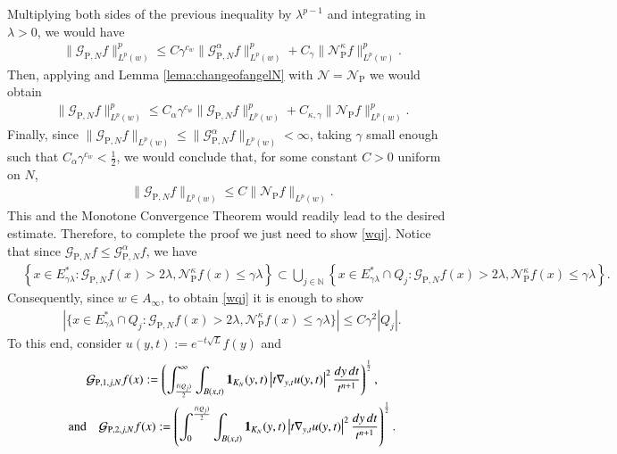 \documentclass[11pt, a4paper,leqno]{amsart}
\renewcommand{\chi}{{\bf 1}}
\theoremstyle{plain}
\theoremstyle{definition}
\theoremstyle{remark}
\numberwithin{equation}{section}
\def \N{ \mathbb{N} }
\def \pp{ \mathrm{P} }
\def \Gcal { \mathcal{G} }
\def \Ncal { \mathcal{N} }
\begin{document}
Multiplying both sides of the previous inequality by $\lambda^{p-1}$ and integrating in $\lambda>0$, we would have
\begin{align*}
\|\Gcal_{\pp,N}f\|_{L^p(w)}^p\leq C\gamma^{c_w}\|\Gcal_{\pp,N}^{\alpha}f\|_{L^p(w)}^p+ C_{\gamma}\|\Ncal_{\pp}^{\kappa}f\|_{L^p(w)}^p.
\end{align*}
Then, applying \cite[Proposition 3.2]{MartellPrisuelos} and Lemma \ref{lema:changeofangelN} with $\mathcal{N}=\mathcal{N}_{\pp}$ we would obtain
\begin{align*}
\|\Gcal_{\pp,N}f\|_{L^p(w)}^p\leq C_{\alpha}\gamma^{c_w}\|\Gcal_{\pp,N}f\|_{L^p(w)}^p+ C_{\kappa,\gamma}\|\Ncal_{\pp}f\|_{L^p(w)}^p.
\end{align*}
Finally, since $\|\Gcal_{\pp,N}f\|_{L^p(w)}\leq \|\Gcal_{\pp,N}^{\alpha}f\|_{L^p(w)}<\infty$, taking $\gamma$ small enough such that $C_{\alpha}\gamma^{c_w}<\frac{1}{2}$, we would conclude that, for some constant $C>0$ uniform on $N$,
\begin{align*}
\|\Gcal_{\pp,N}f\|_{L^p(w)}\le C  \|\Ncal_{\pp}f\|_{L^p(w)}.
\end{align*}
This and the Monotone Convergence Theorem would readily lead to the desired estimate.
Therefore, to complete the proof we just need to show \eqref{wqj}. Notice that since $\Gcal_{\pp,N}f\leq\Gcal_{\pp,N}^{\alpha}f$, we have
\begin{align*}
&\left\{x\in E_{\gamma\lambda}^*  : \Gcal_{\pp,N}f(x)>2\lambda, \Ncal_{\pp}^{\kappa}f(x)\leq \gamma\lambda\right\}
\subset \bigcup_{j\in \N}
\left\{x\in E^*_{\gamma\lambda}\cap Q_j  : \Gcal_{\pp,N}f(x)>2\lambda, \Ncal_{\pp}^{\kappa}f(x)\leq \gamma\lambda\right\}.
\end{align*}
Consequently, since $w\in A_{\infty}$, to obtain \eqref{wqj} it is enough to show
\begin{align}\label{1qj}
|\{x\in E_{\gamma\lambda}^* \cap Q_j: \Gcal_{\pp,N}f(x)>2\lambda, \Ncal_{\pp}^{\kappa}f(x)\leq \gamma \lambda\}|\leq C\gamma^{2}|Q_j|.
\end{align}
To this end,
consider $u(y,t):=e^{-t\sqrt{L}}f(y)$ and
\begin{multline*}
\mathcal{G}_{\pp,1,j,N}f(x):=\left(\int_{\frac{\ell(Q_j)}{2}}^{\infty}
\int_{B(x,t)}\chi_{K_N}(y,t)\left|t\nabla_{y,t}u(y,t)\right|^2\frac{dy \, dt}{t^{n+1}}\right)^{\frac{1}{2}},
\\
 \textrm{and}\quad \mathcal{G}_{
 \pp,2,j,N}f(x):=\left(\int_0^{\frac{\ell(Q_j)}{2}}\int_{B(x,t)}\chi_{K_N}(y,t)\left|t\nabla_{y,t}u(y,t)\right|^2\frac{dy \, dt}{t^{n+1}}\right)^{\frac{1}{2}}.
\end{multline*}
\end{document}
